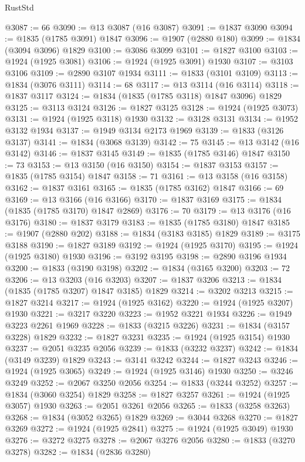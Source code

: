 \begin{lexlean}{RustStd}
\begin{coremodule}
{\begin{coremodule}
{{{{{@3087 := 66
@3090 := @13 @3087 (@16 @3087)
@3091 := @1837 @3090
@3094 := @1835 (@1785 @3091) @1847
@3096 := @1907 (@2880 @180)
@3099 := @1834 (@3094 @3096) @1829
@3100 := @3086 @3099
@3101 := @1827 @3100
@3103 := @1924 (@1925 @3081)
@3106 := @1924 (@1925 @3091) @1930
@3107 := @3103 @3106
@3109 := @2890 @3107 @1934
@3111 := @1833 (@3101 @3109)
@3113 := @1834 (@3076 @3111)
@3114 := 68
@3117 := @13 @3114 (@16 @3114)
@3118 := @1837 @3117
@3124 := @1834 (@1835 (@1785 @3118) @1847 @3096) @1829
@3125 := @3113 @3124
@3126 := @1827 @3125
@3128 := @1924 (@1925 @3073)
@3131 := @1924 (@1925 @3118) @1930
@3132 := @3128 @3131
@3134 := @1952 @3132 @1934
@3137 := @1949 @3134 @2173 @1969
@3139 := @1833 (@3126 @3137)
@3141 := @1834 (@3068 @3139)
@3142 := 75
@3145 := @13 @3142 (@16 @3142)
@3146 := @1837 @3145
@3149 := @1835 (@1785 @3146) @1847
@3150 := 73
@3153 := @13 @3150 (@16 @3150)
@3154 := @1837 @3153
@3157 := @1835 (@1785 @3154) @1847
@3158 := 71
@3161 := @13 @3158 (@16 @3158)
@3162 := @1837 @3161
@3165 := @1835 (@1785 @3162) @1847
@3166 := 69
@3169 := @13 @3166 (@16 @3166)
@3170 := @1837 @3169
@3175 := @1834 (@1835 (@1785 @3170) @1847 @2869)
@3176 := 70
@3179 := @13 @3176 (@16 @3176)
@3180 := @1837 @3179
@3183 := @1835 (@1785 @3180) @1847
@3185 := @1907 (@2880 @202)
@3188 := @1834 (@3183 @3185) @1829
@3189 := @3175 @3188
@3190 := @1827 @3189
@3192 := @1924 (@1925 @3170)
@3195 := @1924 (@1925 @3180) @1930
@3196 := @3192 @3195
@3198 := @2890 @3196 @1934
@3200 := @1833 (@3190 @3198)
@3202 := @1834 (@3165 @3200)
@3203 := 72
@3206 := @13 @3203 (@16 @3203)
@3207 := @1837 @3206
@3213 := @1834 (@1835 (@1785 @3207) @1847 @3185) @1829
@3214 := @3202 @3213
@3215 := @1827 @3214
@3217 := @1924 (@1925 @3162)
@3220 := @1924 (@1925 @3207) @1930
@3221 := @3217 @3220
@3223 := @1952 @3221 @1934
@3226 := @1949 @3223 @2261 @1969
@3228 := @1833 (@3215 @3226)
@3231 := @1834 (@3157 @3228) @1829
@3232 := @1827 @3231
@3235 := @1924 (@1925 @3154) @1930
@3237 := @2051 @3235 @2056
@3239 := @1833 (@3232 @3237)
@3242 := @1834 (@3149 @3239) @1829
@3243 := @3141 @3242
@3244 := @1827 @3243
@3246 := @1924 (@1925 @3065)
@3249 := @1924 (@1925 @3146) @1930
@3250 := @3246 @3249
@3252 := @2067 @3250 @2056
@3254 := @1833 (@3244 @3252)
@3257 := @1834 (@3060 @3254) @1829
@3258 := @1827 @3257
@3261 := @1924 (@1925 @3057) @1930
@3263 := @2051 @3261 @2056
@3265 := @1833 (@3258 @3263)
@3268 := @1834 (@3052 @3265) @1829
@3269 := @3044 @3268
@3270 := @1827 @3269
@3272 := @1924 (@1925 @2841)
@3275 := @1924 (@1925 @3049) @1930
@3276 := @3272 @3275
@3278 := @2067 @3276 @2056
@3280 := @1833 (@3270 @3278)
@3282 := @1834 (@2836 @3280)
}}}}}
\end{coremodule}}
\end{coremodule}
\end{lexlean}
